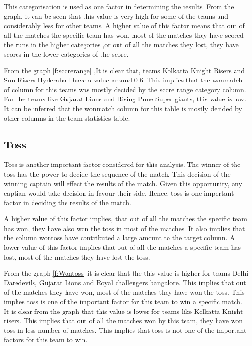 \documentclass[sigconf]{acmart}
\begin{document}
  This categorisation is used as one factor in determining the results. From the graph, it can be seen that this value is very high for some of the teams and considerably less for other teams. A higher value of this factor means that out of all the matches the specific team has won, most of the matches they have scored the runs in the higher categories ,or out of all the matches they lost, they have scores in the lower categories of the score. 

 From the graph \ref{f:scorerange} ,It is clear that, teams Kolkatta Knight Risers and Sun Risers Hyderabad have a value around 0.6. This implies that the wonmatch of column for this teams was mostly decided by the score range category column. For the teams like Gujarat Lions and Rising Pune Super giants, this value is low. It can be inferred that the wonmatch column for this table is mostly decided by other columns in the team statistics table.
 
\subsection{Toss}

Toss is another important factor considered for this analysis. The winner of the toss has the power to decide the sequence of the match. This decision of the winning captain will effect the results of the match. Given this opportunity, any captian would take decision in favour their side. Hence, toss is one important factor in deciding the results of the match. 

A higher value of this factor implies, that out of all the matches the specific team has won, they have also won the toss in most of the matches. It also implies that the column wontoss have contributed a large amount to the target column. A lower value of this factor implies that out of all the matches a specific team has lost, most of the matches they have lost the toss. 

 From the graph \ref{f:Wontoss} it is clear that the this value is higher for teams Delhi Daredevils, Gujarat Lions and Royal challengers bangalore. This implies that out of the matches they have won, most of the matches they have won the toss. This implies toss is one of the important factor for this team to win a specific match. It is clear from the graph that this value is lower for teams like Kolkatta Knight risers. This implies that out of all the matches won by this team, they have won toss in less number of matches. This implies that toss is not one of the important factors for this team to win. 
 
\end{document}
